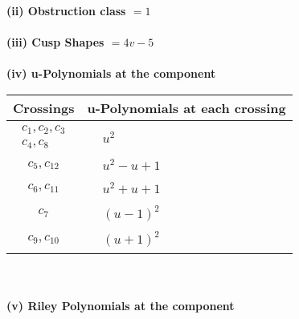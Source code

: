 \documentclass[1p]{elsarticle_modified}
\theoremstyle{definition}
\begin{document}
\flushleft \textbf{(ii) Obstruction class $= 1$}\\~\\
\flushleft \textbf{(iii) Cusp Shapes $= 4 v-5$}\\~\\
\newpage\renewcommand{\arraystretch}{1}
\flushleft \textbf{(iv) u-Polynomials at the component}\newline \\
\begin{tabular}{m{50pt}|m{274pt}}
Crossings & \hspace{64pt}u-Polynomials at each crossing \\
\hline $$\begin{aligned}c_{1},c_{2},c_{3}\\c_{4},c_{8}\end{aligned}$$&$\begin{aligned}
&u^2
\end{aligned}$\\
\hline $$\begin{aligned}c_{5},c_{12}\end{aligned}$$&$\begin{aligned}
&u^2- u+1
\end{aligned}$\\
\hline $$\begin{aligned}c_{6},c_{11}\end{aligned}$$&$\begin{aligned}
&u^2+u+1
\end{aligned}$\\
\hline $$\begin{aligned}c_{7}\end{aligned}$$&$\begin{aligned}
&(u-1)^2
\end{aligned}$\\
\hline $$\begin{aligned}c_{9},c_{10}\end{aligned}$$&$\begin{aligned}
&(u+1)^2
\end{aligned}$\\
\hline
\end{tabular}\\~\\
\newpage\renewcommand{\arraystretch}{1}
\flushleft \textbf{(v) Riley Polynomials at the component}\newline \\
\end{document}
